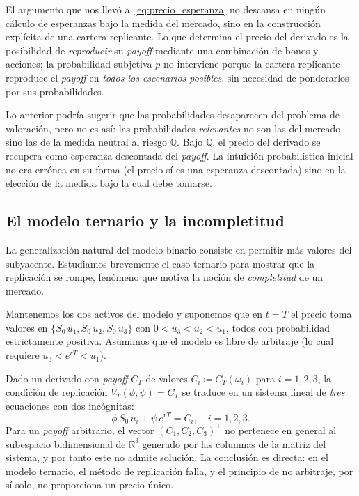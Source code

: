 \documentclass[11pt,a4paper,oneside]{report}
\theoremstyle{plain}
\theoremstyle{definition}
\theoremstyle{remark}
\newcommand{\R}{\mathbb{R}}
\newcommand{\Q}{\mathbb{Q}}
\newcommand{\1}{\mathbf{1}}
\newcommand{\eqdef}{\coloneqq}
\begin{document}
El
argumento que nos llevó a~\eqref{eq:precio_esperanza} no descansa en
ningún cálculo de esperanzas bajo la medida del mercado, sino en la
construcción explícita de una cartera replicante. Lo que determina el
precio del derivado es la posibilidad de \emph{reproducir} su
\emph{payoff} mediante una combinación de bonos y acciones; la
probabilidad subjetiva $p$ no interviene porque la cartera replicante
reproduce el \emph{payoff} en \emph{todos los escenarios posibles}, sin
necesidad de ponderarlos por sus probabilidades.

Lo
anterior podría sugerir que las probabilidades desaparecen del problema
de valoración, pero no es así: las probabilidades \emph{relevantes} no
son las del mercado, sino las de la medida neutral al riesgo $\Q$. Bajo
$\Q$, el precio del derivado se recupera como esperanza descontada del
\emph{payoff}. La intuición probabilística inicial no era errónea en su
forma (el precio sí es una esperanza descontada) sino en la elección de
la medida bajo la cual debe tomarse.

\subsection{El modelo ternario y la incompletitud}
\label{subsec:ternario}

La generalización natural del modelo binario consiste en permitir
más valores del subyacente. Estudiamos brevemente el caso ternario
para mostrar que la replicación se rompe, fenómeno que motiva la
noción de \emph{completitud} de un mercado.

\medskip

Mantenemos los dos activos del modelo y suponemos que en $t = T$ el
precio toma valores en $\{S_0\, u_1, S_0\, u_2, S_0\, u_3\}$ con $0 <
u_3 < u_2 < u_1$, todos con probabilidad estrictamente positiva.
Asumimos que el modelo es libre de arbitraje (lo cual requiere $u_3 <
e^{rT} < u_1$).

Dado un derivado con \emph{payoff} $C_T$ de valores $C_i \eqdef
C_T(\omega_i)$ para $i = 1, 2, 3$, la condición de replicación
$V_T(\phi, \psi) = C_T$ se traduce en un sistema lineal de \emph{tres}
ecuaciones con dos incógnitas:
\begin{equation*}
  \phi\, S_0\, u_i + \psi\, e^{rT} = C_i, \quad i = 1, 2, 3.
\end{equation*}
Para un \emph{payoff} arbitrario, el vector $(C_1, C_2, C_3)^\top$ no
pertenece en general al subespacio bidimensional de $\R^3$ generado por
las columnas de la matriz del sistema, y por tanto este no admite
solución. La conclusión es directa: en el modelo ternario, el método de
replicación falla, y el principio de no arbitraje, por sí solo, no
proporciona un precio único.
\end{document}
